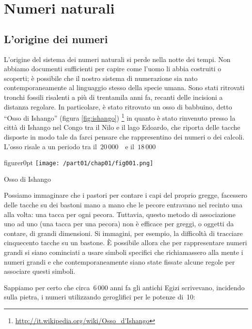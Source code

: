 
\chapter{Numeri naturali}

\section{L'origine dei numeri}

L'origine del sistema dei numeri naturali si perde nella notte dei tempi. Non abbiamo
documenti sufficienti per capire come l'uomo li abbia costruiti o scoperti; è possibile
che il nostro sistema di numerazione sia nato contemporaneamente al linguaggio stesso
della specie umana. Sono stati ritrovati tronchi fossili risalenti a più di trentamila
anni fa, recanti delle incisioni a distanza regolare. In particolare, è stato ritrovato un
osso di babbuino, detto ``Osso di Ishango'' (figura \ref{fig:ishango})
\footnote{\url{http://it.wikipedia.org/wiki/Osso_d'Ishango}} in quanto è stato rinvenuto presso la città di
Ishango nel Congo tra il Nilo e il lago Edoardo, che riporta delle tacche disposte
in modo tale da farci pensare che rappresentino dei numeri o dei calcoli. L'osso risale a
un periodo tra il~$20\,000$~\aC\ e il~$18\,000$~\aC

\begin{wrapfloat}{figure}{r}{0pt}
\texttt{[image: /part01/chap01/fig001.png]}
\caption{Osso di Ishango}
\label{fig:ishango}
\end{wrapfloat}
Possiamo immaginare che i pastori per contare i capi del proprio gregge, facessero delle
tacche su dei bastoni mano a mano che le pecore entravano nel recinto una alla volta: una
tacca per ogni pecora. Tuttavia, questo metodo di associazione uno ad uno (una tacca per
una pecora) non è efficace per greggi, o oggetti da contare, di grandi dimensioni. Si
immagini, per esempio, la difficoltà di tracciare cinquecento tacche su un bastone. È
possibile allora che per rappresentare numeri grandi si siano cominciati a usare simboli
specifici che richiamassero alla mente i numeri grandi e che contemporaneamente siano
state fissate alcune regole per associare questi simboli.

Sappiamo per certo che circa~6\,000 anni fa gli antichi Egizi scrivevano, incidendo sulla
pietra, i numeri utilizzando geroglifici per le potenze di~10:

